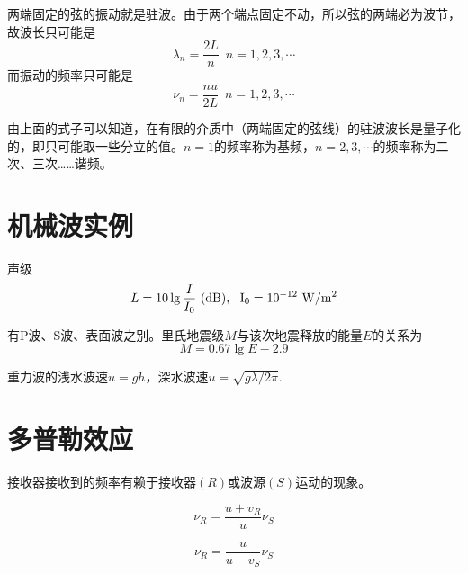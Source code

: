 \par 两端固定的弦的振动就是驻波。由于两个端点固定不动，所以弦的两端必为波节，故波长只可能是
\begin{equation}
\lambda_n=\frac{2L}{n}\,\,\,n=1,2,3,\cdots
\end{equation}
而振动的频率只可能是
\begin{equation}
\nu_n=\frac{nu}{2L}\,\,\,n=1,2,3,\cdots
\end{equation}
\par 由上面的式子可以知道，在有限的介质中（两端固定的弦线）的驻波波长是量子化的，即只可能取一些分立的值。$n=1$的频率称为基频，$n=2,3,\cdots $的频率称为二次、三次……谐频。

\section{机械波实例}
声级
\begin{equation*}
L=10\lg \frac{I}{I_0} \,\,(\rm{dB}),\,\,\,\, I_0=10^{-12} \,\,\rm{W}/\rm{m}^2
\end{equation*}

有P波、S波、表面波之别。里氏地震级$M$与该次地震释放的能量$E$的关系为
\begin{equation*}
M=0.67 \lg E -2.9
\end{equation*}

重力波的浅水波速$u=gh$，深水波速$u=\sqrt{g\lambda/2\pi}$.

\section{多普勒效应}
\jg 
\par 接收器接收到的频率有赖于接收器$(R)$或波源$(S)$运动的现象。\jg

\par \dya[波源静止]
\begin{equation}
\nu_R=\frac{u+v_R}{u}\nu_S
\end{equation}

\par \dya[接收器静止]
\begin{equation}
\nu_R=\frac{u}{u-v_S}\nu_S
\end{equation}

